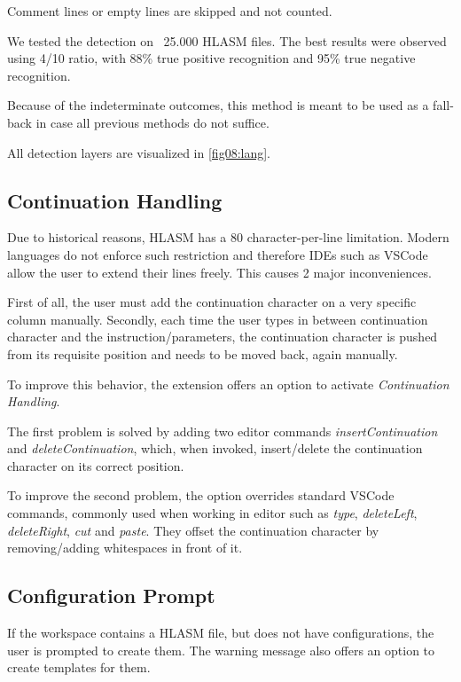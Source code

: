 Comment lines or empty lines are skipped and not counted. 

We tested the detection on ~25.000 HLASM files. The best results were observed using 4/10 ratio, with 88\% true positive recognition and 95\% true negative recognition. 

Because of the indeterminate outcomes, this method is meant to be used as a fall-back in case all previous methods do not suffice.

All detection layers are visualized in \cref{fig08:lang}.

\subsection{Continuation Handling}

Due to historical reasons, HLASM has a 80 character-per-line limitation. Modern languages do not enforce such restriction and therefore IDEs such as VSCode allow the user to extend their lines freely. This causes 2 major inconveniences.

First of all, the user must add the continuation character on a very specific column manually. Secondly, each time the user types in between continuation character and the instruction/parameters, the continuation character is pushed from its requisite position and needs to be moved back, again manually.

To improve this behavior, the extension offers an option to activate \emph{Continuation Handling}. 

The first problem is solved by adding two editor commands \emph{insertContinuation} and \emph{deleteContinuation}, which, when invoked, insert/delete the continuation character on its correct position.

To improve the second problem, the option overrides standard VSCode commands, commonly used when working in editor such as \emph{type}, \emph{deleteLeft}, \emph{deleteRight}, \emph{cut} and \emph{paste}. They offset the continuation character by removing/adding whitespaces in front of it.


\subsection{Configuration Prompt}

If the workspace contains a HLASM file, but does not have configurations, the user is prompted to create them. The warning message also offers an option to create templates for them.

